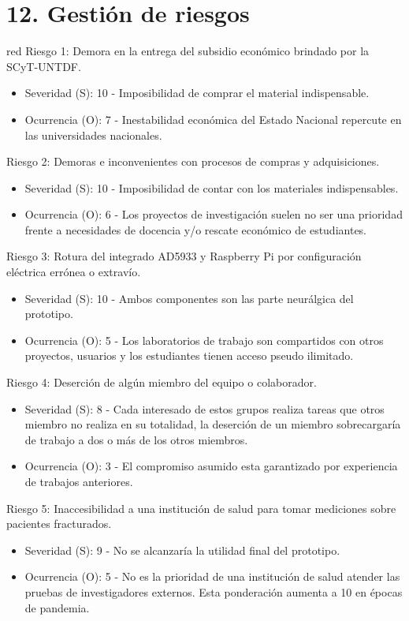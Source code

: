\documentclass[11pt]{charter}
\begin{document}
\pagebreak
\section{12. Gestión de riesgos}
\label{sec:riesgos}

\begin{consigna}{red}
Riesgo 1: Demora en la entrega del subsidio económico brindado por la SCyT-UNTDF.
\begin{itemize}
\item Severidad (S): 10 - Imposibilidad de comprar el material indispensable.
\item Ocurrencia (O): 7 - Inestabilidad económica del Estado Nacional repercute en las universidades nacionales.
\end{itemize}

Riesgo 2: Demoras e inconvenientes con procesos de compras y adquisiciones.
\begin{itemize}
\item Severidad (S): 10 - Imposibilidad de contar con los materiales indispensables.
\item Ocurrencia (O): 6 - Los proyectos de investigación suelen no ser una prioridad frente a necesidades de docencia y/o rescate económico de estudiantes.
\end{itemize}

Riesgo 3: Rotura del integrado AD5933  y Raspberry Pi por configuración eléctrica errónea o extravío.
\begin{itemize}
\item Severidad (S): 10 - Ambos componentes son las parte neurálgica del prototipo.
\item Ocurrencia (O): 5 - Los laboratorios de trabajo son compartidos con otros proyectos, usuarios y los estudiantes tienen acceso pseudo ilimitado.
\end{itemize}

Riesgo 4: Deserción de algún miembro del equipo o colaborador.
\begin{itemize}
\item Severidad (S): 8 - Cada interesado de estos grupos realiza tareas que otros miembro no realiza en su totalidad, la deserción de un miembro sobrecargaría de trabajo a dos o más de los otros miembros.
\item Ocurrencia (O): 3 - El compromiso asumido esta garantizado por experiencia de trabajos anteriores.
\end{itemize}

Riesgo 5: Inaccesibilidad a una institución de salud para tomar mediciones sobre pacientes fracturados.
\begin{itemize}
\item Severidad (S): 9 - No se alcanzaría la utilidad final del prototipo.
\item Ocurrencia (O): 5 - No es la prioridad de una institución de salud atender las pruebas de investigadores externos. Esta ponderación aumenta a 10 en épocas de pandemia. 
\end{itemize}



\end{consigna}
\end{document}
